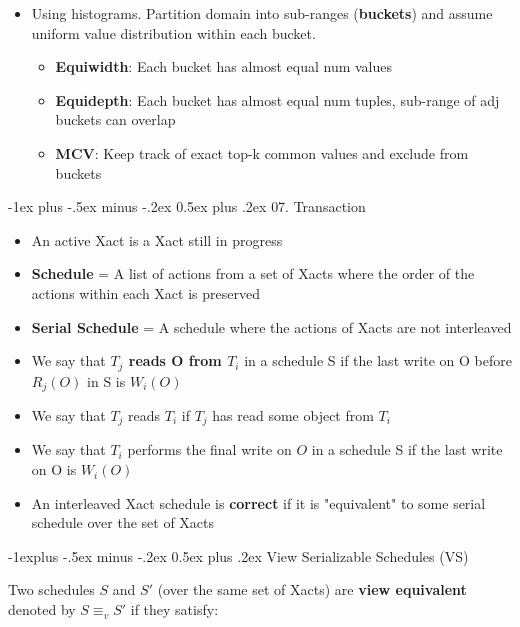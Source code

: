 \documentclass[9pt, landscape]{extarticle}
\makeatletter
\renewcommand{\section}{\@startsection{section}{1}{0mm}%
  {-1ex plus -.5ex minus -.2ex}%
  {0.5ex plus .2ex}%
{\normalfont\large\bfseries}}
\renewcommand{\subsection}{\@startsection{subsection}{2}{0mm}%
  {-1explus -.5ex minus -.2ex}%
  {0.5ex plus .2ex}%
{\normalfont\normalsize\bfseries}}
\makeatother
\begin{document}
\begin{multicols*}{4}
\begin{itemize}
    \item Using histograms. Partition domain into sub-ranges (\textbf{buckets}) and assume uniform value distribution within each bucket.
    \begin{itemize}
      \item \textbf{Equiwidth}: Each bucket has almost equal num values
      \item \textbf{Equidepth}: Each bucket has almost equal num tuples, sub-range of adj buckets can overlap
      \item \textbf{MCV}: Keep track of exact top-k common values and exclude from buckets 
    \end{itemize}
  \end{itemize}

  \section{07. Transaction}

  \begin{itemize}
    \item An active Xact is a Xact still in progress
    \item \textbf{Schedule} = A list of actions from a set of Xacts where the order of the actions within each Xact is preserved
    \item \textbf{Serial Schedule} = A schedule where the actions of Xacts are not interleaved
    \item We say that \textbf{$T_j$ reads O from $T_i$} in a schedule S if the last write on O before $R_j(O)$ in S is $W_i(O)$ 
    \item We say that $T_j$ reads $T_i$ if $T_j$ has read some object from $T_i$ 
    \item We say that $T_i$ performs the final write on $O$ in a schedule S if the last write on O is $W_i(O)$
    \item An interleaved Xact schedule is \textbf{correct} if it is "equivalent" to some serial schedule over the set of Xacts 
  \end{itemize}

  \subsection{View Serializable Schedules (VS)}
  
  Two schedules $S$ and $S'$ (over the same set of Xacts) are \textbf{view equivalent} denoted by $S \equiv_v S'$ if they satisfy:


\end{multicols*}
\end{document}
